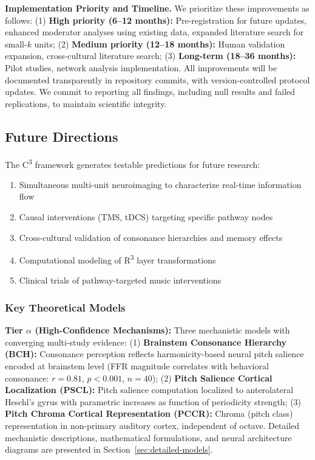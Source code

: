 \documentclass[9pt,onecolumn]{article}
\newcommand{\Cthree}{C\textsuperscript{3}}
\newcommand{\Rthree}{R\textsuperscript{3}}
\begin{document}
\textbf{Implementation Priority and Timeline.} We prioritize these improvements as follows: (1) \textbf{High priority (6--12 months):} Pre-registration for future updates, enhanced moderator analyses using existing data, expanded literature search for small-$k$ units; (2) \textbf{Medium priority (12--18 months):} Human validation expansion, cross-cultural literature search; (3) \textbf{Long-term (18--36 months):} Pilot studies, network analysis implementation. All improvements will be documented transparently in repository commits, with version-controlled protocol updates. We commit to reporting all findings, including null results and failed replications, to maintain scientific integrity.

\subsection{Future Directions}

The \Cthree{} framework generates testable predictions for future research:

\begin{enumerate}[leftmargin=*, topsep=2pt, itemsep=1pt]
    \item Simultaneous multi-unit neuroimaging to characterize real-time information flow
    \item Causal interventions (TMS, tDCS) targeting specific pathway nodes
    \item Cross-cultural validation of consonance hierarchies and memory effects
    \item Computational modeling of \Rthree{} layer transformations
    \item Clinical trials of pathway-targeted music interventions
\end{enumerate}


\subsubsection{Key Theoretical Models}

\textbf{Tier $\alpha$ (High-Confidence Mechanisms):} Three mechanistic models with converging multi-study evidence: (1) \textbf{Brainstem Consonance Hierarchy (BCH):} Consonance perception reflects harmonicity-based neural pitch salience encoded at brainstem level (FFR magnitude correlates with behavioral consonance: $r=0.81$, $p<0.001$, $n=40$); (2) \textbf{Pitch Salience Cortical Localization (PSCL):} Pitch salience computation localized to anterolateral Heschl's gyrus with parametric increases as function of periodicity strength; (3) \textbf{Pitch Chroma Cortical Representation (PCCR):} Chroma (pitch class) representation in non-primary auditory cortex, independent of octave. Detailed mechanistic descriptions, mathematical formulations, and neural architecture diagrams are presented in Section~\ref{sec:detailed-models}.
\end{document}
